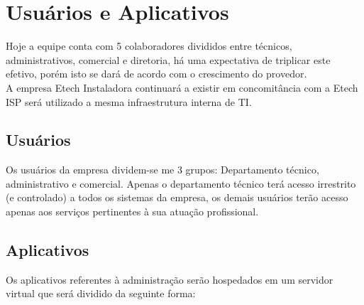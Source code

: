 \documentclass[	DIV=calc,%
							paper=a4,%
							fontsize=12pt,%
							onecolumn]{scrartcl}	 					%
\begin{document}
\section{Usuários e Aplicativos}
Hoje a equipe conta com 5 colaboradores divididos entre técnicos, administrativos, comercial e diretoria, há uma expectativa de triplicar este efetivo, porém isto se dará de acordo com o crescimento do provedor.\\
A empresa Etech Instaladora continuará a existir em concomitância com a Etech ISP será utilizado a mesma infraestrutura interna de TI.
 

\subsection{Usuários}

Os usuários da empresa dividem-se me 3 grupos: Departamento técnico, administrativo e comercial.
Apenas o departamento técnico terá acesso irrestrito (e controlado) a todos os sistemas da empresa, os demais usuários terão acesso apenas aos serviços pertinentes à sua atuação profissional.


\subsection{Aplicativos}
Os aplicativos referentes à administração serão hospedados em um servidor virtual que será dividido da seguinte forma:\\
\end{document}

